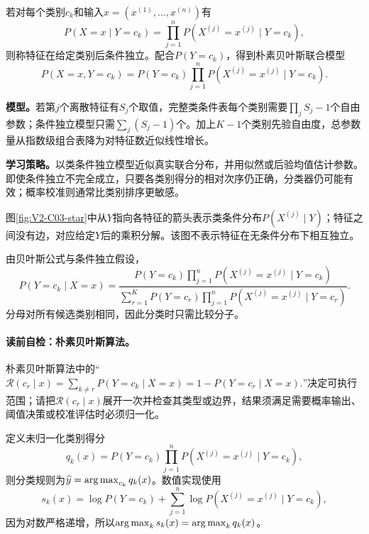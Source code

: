 \begin{definition}[朴素贝叶斯条件独立模型]
若对每个类别$c_k$和输入$x=(x^{(1)},\ldots,x^{(n)})$有
\[
P(X=x\mid Y=c_k)=\prod_{j=1}^{n}P(X^{(j)}=x^{(j)}\mid Y=c_k),
\]
则称特征在给定类别后条件独立。配合$P(Y=c_k)$，得到朴素贝叶斯联合模型
\[
P(X=x,Y=c_k)=P(Y=c_k)\prod_{j=1}^{n}P(X^{(j)}=x^{(j)}\mid Y=c_k).
\]
\end{definition}

\label{struct:V2-C03-CH08}
\textbf{模型。}若第$j$个离散特征有$S_j$个取值，完整类条件表每个类别需要$\prod_jS_j-1$个自由参数；条件独立模型只需$\sum_j(S_j-1)$个。加上$K-1$个类别先验自由度，总参数量从指数级组合表降为对特征数近似线性增长。

\label{struct:V2-C03-CH09}
\textbf{学习策略。}以类条件独立模型近似真实联合分布，并用似然或后验均值估计参数。即使条件独立不完全成立，只要各类别得分的相对次序仍正确，分类器仍可能有效；概率校准则通常比类别排序更敏感。

\label{struct:V2-C03-CH17}

图\ref{fig:V2-C03-star}中从$Y$指向各特征的箭头表示类条件分布$P(X^{(j)}\mid Y)$；特征之间没有边，对应给定$Y$后的乘积分解。该图不表示特征在无条件分布下相互独立。


由贝叶斯公式与条件独立假设，
\[
P(Y=c_k\mid X=x)=
\frac{P(Y=c_k)\prod_{j=1}^{n}P(X^{(j)}=x^{(j)}\mid Y=c_k)}
{\sum_{r=1}^{K}P(Y=c_r)\prod_{j=1}^{n}P(X^{(j)}=x^{(j)}\mid Y=c_r)}.
\]
分母对所有候选类别相同，因此分类时只需比较分子。

\paragraph{读前自检：朴素贝叶斯算法。}朴素贝叶斯算法中的“$\mathcal R(c_r\mid x)=\sum_{k\ne r}P(Y=c_k\mid X=x) =1-P(Y=c_r\mid X=x).$”决定可执行范围；请把$\mathcal R(c_r\mid x)$展开一次并检查其类型或边界，结果须满足需要概率输出、阈值决策或校准评估时必须归一化。\par

定义未归一化类别得分
\[
q_k(x)=P(Y=c_k)\prod_{j=1}^{n}P(X^{(j)}=x^{(j)}\mid Y=c_k),
\]
则分类规则为$\widehat y=\operatorname*{arg\,max}_{c_k}q_k(x)$。数值实现使用
\[
s_k(x)=\log P(Y=c_k)+\sum_{j=1}^{n}\log P(X^{(j)}=x^{(j)}\mid Y=c_k),
\]
因为对数严格递增，所以$\operatorname*{arg\,max}_k s_k(x)=\operatorname*{arg\,max}_k q_k(x)$。

